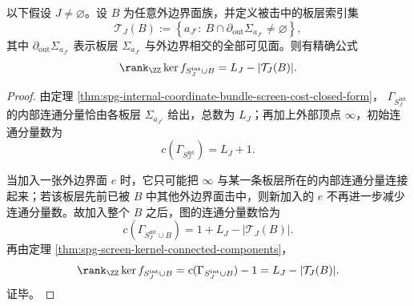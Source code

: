 \begin{theorem}\label{thm:conclusion-coordinate-bundle-outer-boundary-residual-rank}
以下假设 \(J\neq\varnothing\)。设 \(B\) 为任意外边界面族，并定义被击中的板层索引集
\[
\mathcal T_J(B):=
\left\{
a_{J^c}:\ 
B\cap \partial_{\mathrm{out}}\Sigma_{a_{J^c}}\neq\varnothing
\right\},
\]
其中 \(\partial_{\mathrm{out}}\Sigma_{a_{J^c}}\) 表示板层 \(\Sigma_{a_{J^c}}\) 与外边界相交的全部可见面。则有精确公式
\[
\rank_{\ZZ}\ker f_{S_J^{\mathrm{int}}\cup B}
=
L_J-|\mathcal T_J(B)|.
\]
\end{theorem}
\begin{proof}
由定理 \ref{thm:spg-internal-coordinate-bundle-screen-cost-closed-form}，
\(\Gamma_{S_J^{\mathrm{int}}}\) 的内部连通分量恰由各板层 \(\Sigma_{a_{J^c}}\) 给出，总数为 \(L_J\)；再加上外部顶点 \(\infty\)，初始连通分量数为
\[
c(\Gamma_{S_J^{\mathrm{int}}})=L_J+1.
\]

当加入一张外边界面 \(e\) 时，它只可能把 \(\infty\) 与某一条板层所在的内部连通分量连接起来；若该板层先前已被 \(B\) 中其他外边界面击中，则新加入的 \(e\) 不再进一步减少连通分量数。故加入整个 \(B\) 之后，图的连通分量数恰为
\[
c(\Gamma_{S_J^{\mathrm{int}}\cup B})=1+L_J-|\mathcal T_J(B)|.
\]
再由定理 \ref{thm:spg-screen-kernel-connected-components}，
\[
\rank_{\ZZ}\ker f_{S_J^{\mathrm{int}}\cup B}
=
c(\Gamma_{S_J^{\mathrm{int}}\cup B})-1
=
L_J-|\mathcal T_J(B)|.
\]
证毕。
\end{proof}


